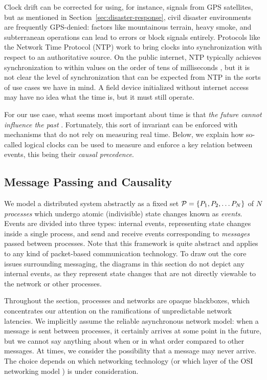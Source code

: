 \documentclass[]             %
{NASA}                       %
\theoremstyle{definition}
\begin{document}
Clock drift can be corrected for using, for instance, signals from GPS
satellites, but as mentioned in Section~\ref{sec:disaster-response},
civil disaster environments are frequently GPS-denied: factors like
mountainous terrain, heavy smoke, and subterranean operations can lead
to errors or block signals entirely. Protocols like the Network Time
Protocol (NTP) \cite{rfc1119} work to bring clocks into
synchronization with respect to an authoritative source. On the public
internet, NTP typically achieves synchronization to within values on the
order of tens of milliseconds \cite{rfc1128}, but it is not clear the
level of synchronization that can be expected from NTP in the sorts of use
cases we have in mind. A field device initialized without internet
access may have no idea what the time is, but it must still operate.

For our use case, what seems most important about time is that
\emph{the future cannot influence the past}
\cite{1989mattern}. Fortunately, this sort of invariant can be
enforced with mechanisms that do not rely on measuring real
time. Below, we explain how so-called logical clocks can be used to
measure and enforce a key relation between events, this being their
\emph{causal precedence}.


\subsection{Message Passing and Causality}
\label{ssec:message-passing}
We model a distributed system abstractly as a fixed set
$\mathcal{P} = \{P_1, P_2, \ldots P_N\}$ of $N$ \emph{processes} which
undergo atomic (indivisible) state changes known as
\emph{events}. Events are divided into three types: internal events,
representing state changes inside a single process, and send and
receive events corresponding to \emph{messages} passed between
processes. Note that this framework is quite abstract and applies to
any kind of packet-based communication technology. To draw out the
core issues surrounding messaging, the diagrams in this section do not
depict any internal events, as they represent state changes that are
not directly viewable to the network or other processes.

Throughout the section, processes and networks are opaque blackboxes,
which concentrates our attention on the ramifications of unpredictable
network latencies. We implicitly assume the reliable asynchronous
network model: when a message is sent between processes, it certainly
arrives at some point in the future, but we cannot say anything about
when or in what order compared to other messages. At times, we
consider the possibility that a message may never arrive. The choice
depends on which networking technology (or which layer of the OSI
networking model \cite{1983:osi-reference-model}) is under
consideration.
\end{document}
